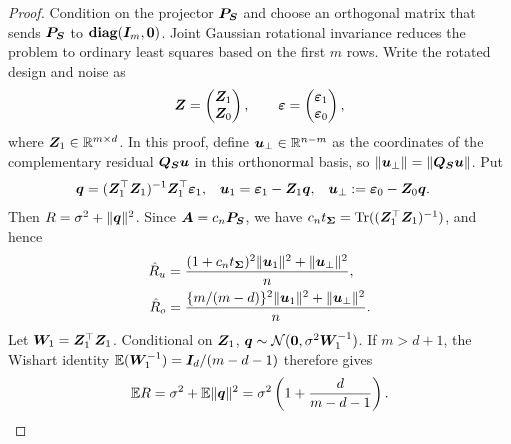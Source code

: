 \documentclass{article}
\theoremstyle{plain} %
\theoremstyle{definition} %
\theoremstyle{definition} %
\newcommand{\hR}{\hat{R}}
\begin{document}
\begin{proof}
Condition on the projector $\boldsymbol{P}_{\boldsymbol{S}}$ and choose an orthogonal matrix that sends
$\boldsymbol{P}_{\boldsymbol{S}}$ to $\operatorname{\mathbf{diag}}(\boldsymbol{I}_m,\mathbf{0})$.  Joint Gaussian rotational invariance
reduces the problem to ordinary least squares based on the first $m$ rows.
Write the rotated design and noise as
\begin{align*}
    \boldsymbol{Z}=\begin{pmatrix}\boldsymbol{Z}_1\\\boldsymbol{Z}_0\end{pmatrix},
    \qquad
    {\boldsymbol{\varepsilon} }=\begin{pmatrix}{\boldsymbol{\varepsilon} }_1\\{\boldsymbol{\varepsilon} }_0\end{pmatrix},
\end{align*}
where $\boldsymbol{Z}_1\in{\mathbb{R}}^{m\times d}$.      In this proof, define
$\boldsymbol{u}_\perp\in{\mathbb{R}}^{n-m}$ as the coordinates of the complementary residual
$\boldsymbol{Q}_{\boldsymbol{S}}\boldsymbol{u}$ in this orthonormal basis, so
$\lVert\boldsymbol{u}_\perp\rVert=\lVert\boldsymbol{Q}_{\boldsymbol{S}}\boldsymbol{u}\rVert$. Put 
\begin{align*}
    \boldsymbol{q}&=(\boldsymbol{Z}_1^\top\boldsymbol{Z}_1)^{-1}\boldsymbol{Z}_1^\top{\boldsymbol{\varepsilon} }_1,
    & \boldsymbol{u}_1&={\boldsymbol{\varepsilon} }_1-\boldsymbol{Z}_1\boldsymbol{q},
    &
    \boldsymbol{u}_\perp&:={\boldsymbol{\varepsilon} }_0-\boldsymbol{Z}_0\boldsymbol{q}.
\end{align*}
Then $R=\sigma^2+\lVert\boldsymbol{q}\rVert^2$.  Since $\boldsymbol{A}=c_n\boldsymbol{P}_{\boldsymbol{S}}$, we have
$c_nt_{\boldsymbol{\Sigma}}=\operatorname{Tr}((\boldsymbol{Z}_1^\top\boldsymbol{Z}_1)^{-1})$, and hence
\begin{align*}
    \hR_u
    &=\frac{(1+c_nt_{\bSigma})^2\norm{\bu_1}^2+\norm{\bu_\perp}^2}{n},\\
    \hR_o
    &=\frac{\{m/(m-d)\}^2\norm{\bu_1}^2+\norm{\bu_\perp}^2}{n}.
\end{align*}
Let $\boldsymbol{W}_1=\boldsymbol{Z}_1^\top\boldsymbol{Z}_1$.  Conditional on $\boldsymbol{Z}_1$,
$\boldsymbol{q}\sim{\mathcal N}(\mathbf{0},\sigma^2\boldsymbol{W}_1^{-1})$.  If $m>d+1$, the Wishart
identity ${\mathbb{E}}(\boldsymbol{W}_1^{-1})=\boldsymbol{I}_d/(m-d-1)$ therefore gives
\begin{align}
    {\mathbb{E}} R
    =\sigma^2+{\mathbb{E}}\lVert\boldsymbol{q}\rVert^2
    =\sigma^2\left(1+\frac{d}{m-d-1}\right).
    \label{eq:tight-frame-exact-risk}
\end{align}


\end{proof}
\end{document}
